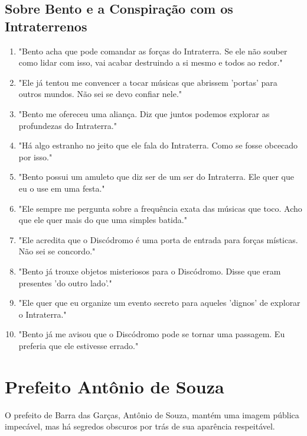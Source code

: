 \subsection*{Sobre Bento e a Conspiração com os Intraterrenos}
\begin{enumerate}
    \item "Bento acha que pode comandar as forças do Intraterra. Se ele não souber como lidar com isso, vai acabar destruindo a si mesmo e todos ao redor."
    \item "Ele já tentou me convencer a tocar músicas que abrissem 'portas' para outros mundos. Não sei se devo confiar nele."
    \item "Bento me ofereceu uma aliança. Diz que juntos podemos explorar as profundezas do Intraterra."
    \item "Há algo estranho no jeito que ele fala do Intraterra. Como se fosse obcecado por isso."
    \item "Bento possui um amuleto que diz ser de um ser do Intraterra. Ele quer que eu o use em uma festa."
    \item "Ele sempre me pergunta sobre a frequência exata das músicas que toco. Acho que ele quer mais do que uma simples batida."
    \item "Ele acredita que o Discódromo é uma porta de entrada para forças místicas. Não sei se concordo."
    \item "Bento já trouxe objetos misteriosos para o Discódromo. Disse que eram presentes 'do outro lado'."
    \item "Ele quer que eu organize um evento secreto para aqueles 'dignos' de explorar o Intraterra."
    \item "Bento já me avisou que o Discódromo pode se tornar uma passagem. Eu preferia que ele estivesse errado."
\end{enumerate}

\section{Prefeito Antônio de Souza}
O prefeito de Barra das Garças, Antônio de Souza, mantém uma imagem pública impecável, mas há segredos obscuros por trás de sua aparência respeitável.

